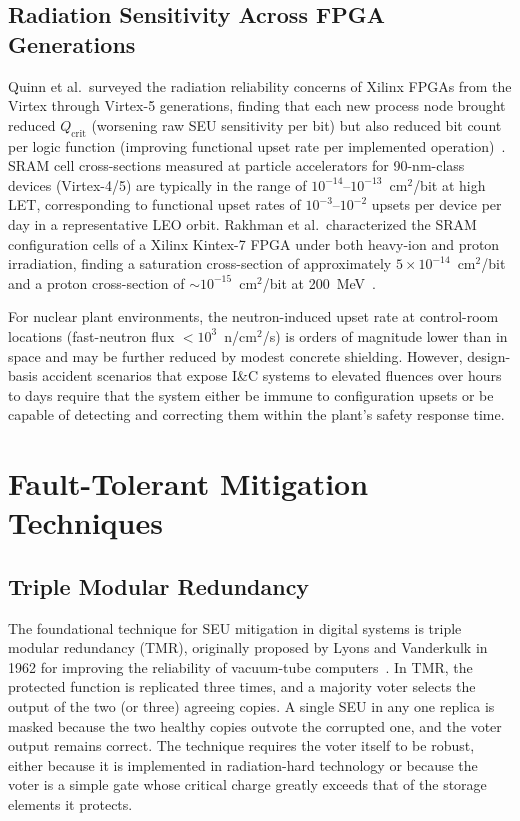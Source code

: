 \subsection{Radiation Sensitivity Across FPGA Generations}

Quinn et al.\ surveyed the radiation reliability concerns of Xilinx
FPGAs from the Virtex through Virtex-5 generations, finding that
each new process node brought reduced $Q_{\mathrm{crit}}$ (worsening
raw SEU sensitivity per bit) but also reduced bit count per logic
function (improving functional upset rate
per implemented operation)~\cite{quinn2007review}.  SRAM cell
cross-sections measured at particle accelerators for 90-nm-class
devices (Virtex-4/5) are typically in the range of
$10^{-14}$--$10^{-13}$~cm$^2$/bit at high LET, corresponding
to functional upset rates of $10^{-3}$--$10^{-2}$ upsets per
device per day in a representative LEO orbit.  Rakhman et al.\ 
characterized the SRAM configuration cells of a Xilinx Kintex-7
FPGA under both heavy-ion and proton irradiation, finding a
saturation cross-section of approximately $5 \times 10^{-14}$~cm$^2$/bit
and a proton cross-section of $\sim 10^{-15}$~cm$^2$/bit at
200~MeV~\cite{rakhman2017sram}.

For nuclear plant environments, the neutron-induced upset rate at
control-room locations (fast-neutron flux $< 10^3$~n/cm$^2$/s)
is orders of magnitude lower than in space and may be further
reduced by modest concrete shielding.  However, design-basis
accident scenarios that expose I\&C systems to elevated fluences
over hours to days require that the system either be immune to
configuration upsets or be capable of detecting and correcting
them within the plant's safety response time.

\section{Fault-Tolerant Mitigation Techniques}
\label{sec:mitigation}

\subsection{Triple Modular Redundancy}

The foundational technique for SEU mitigation in digital systems
is triple modular redundancy (TMR), originally proposed by Lyons
and Vanderkulk in 1962 for improving the reliability of vacuum-tube
computers~\cite{lyons1962tmr}.  In TMR, the protected function is
replicated three times, and a majority voter selects the output of
the two (or three) agreeing copies.  A single SEU in any one replica
is masked because the two healthy copies outvote the corrupted one,
and the voter output remains correct.  The technique requires the
voter itself to be robust, either because it is implemented in
radiation-hard technology or because the voter is a simple gate
whose critical charge greatly exceeds that of the storage elements
it protects.

